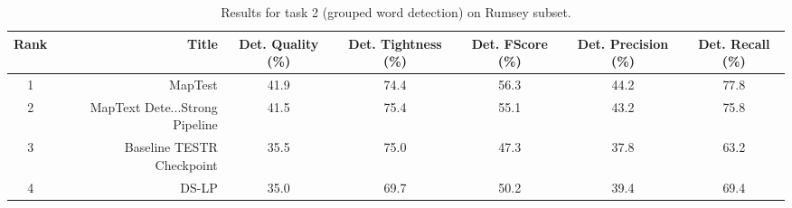 \begin{table}
\caption{Results for task 2 (grouped word detection) on Rumsey subset.}
\begin{tabular}{crccccc}
\toprule
Rank & Title & Det. Quality (\%) & Det. Tightness (\%) & Det. FScore (\%) & Det. Precision (\%) & Det. Recall (\%) \\
\midrule
1 & MapTest & 41.9 & 74.4 & 56.3 & 44.2 & 77.8 \\
2 & MapText Dete...Strong Pipeline & 41.5 & 75.4 & 55.1 & 43.2 & 75.8 \\
3 & Baseline TESTR Checkpoint & 35.5 & 75.0 & 47.3 & 37.8 & 63.2 \\
4 & DS-LP & 35.0 & 69.7 & 50.2 & 39.4 & 69.4 \\
\bottomrule
\end{tabular}
\end{table}
